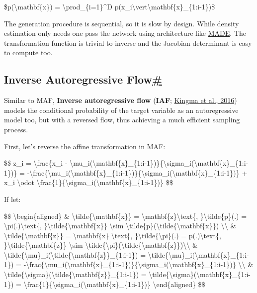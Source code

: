 \$p(\textbackslash mathbf\{x\}) = \textbackslash prod\_\{i=1\}\^{}D p(x\_i\textbackslash vert\textbackslash mathbf\{x\}\_\{1:i-1\})\$

The generation procedure is sequential, so it is slow by design. While density estimation only needs one pass the network using architecture like \hyperref[MADE]{MADE}. The transformation function is trivial to inverse and the Jacobian determinant is easy to compute too.

\subsection{\texorpdfstring{Inverse Autoregressive Flow\hyperref[inverse-autoregressive-flow]{\#}}{Inverse Autoregressive Flow\#}}\label{inverse-autoregressive-flow}

Similar to MAF, \textbf{Inverse autoregressive flow} (\textbf{IAF}; \href{https://arxiv.org/abs/1606.04934}{Kingma et al., 2016}) models the conditional probability of the target variable as an autoregressive model too, but with a reversed flow, thus achieving a much efficient sampling process.

First, let's reverse the affine transformation in MAF:

\$\$ z\_i = \textbackslash frac\{x\_i - \textbackslash mu\_i(\textbackslash mathbf\{x\}\_\{1:i-1\})\}\{\textbackslash sigma\_i(\textbackslash mathbf\{x\}\_\{1:i-1\})\} = -\textbackslash frac\{\textbackslash mu\_i(\textbackslash mathbf\{x\}\_\{1:i-1\})\}\{\textbackslash sigma\_i(\textbackslash mathbf\{x\}\_\{1:i-1\})\} + x\_i \textbackslash odot \textbackslash frac\{1\}\{\textbackslash sigma\_i(\textbackslash mathbf\{x\}\_\{1:i-1\})\} \$\$

If let:

\$\$ \textbackslash begin\{aligned\} \& \textbackslash tilde\{\textbackslash mathbf\{x\}\} = \textbackslash mathbf\{z\}\textbackslash text\{, \}\textbackslash tilde\{p\}(.) = \textbackslash pi(.)\textbackslash text\{, \}\textbackslash tilde\{\textbackslash mathbf\{x\}\} \textbackslash sim \textbackslash tilde\{p\}(\textbackslash tilde\{\textbackslash mathbf\{x\}\}) \textbackslash\textbackslash{} \& \textbackslash tilde\{\textbackslash mathbf\{z\}\} = \textbackslash mathbf\{x\} \textbackslash text\{, \}\textbackslash tilde\{\textbackslash pi\}(.) = p(.)\textbackslash text\{, \}\textbackslash tilde\{\textbackslash mathbf\{z\}\} \textbackslash sim \textbackslash tilde\{\textbackslash pi\}(\textbackslash tilde\{\textbackslash mathbf\{z\}\})\textbackslash\textbackslash{} \& \textbackslash tilde\{\textbackslash mu\}\_i(\textbackslash tilde\{\textbackslash mathbf\{z\}\}\_\{1:i-1\}) = \textbackslash tilde\{\textbackslash mu\}\_i(\textbackslash mathbf\{x\}\_\{1:i-1\}) = -\textbackslash frac\{\textbackslash mu\_i(\textbackslash mathbf\{x\}\_\{1:i-1\})\}\{\textbackslash sigma\_i(\textbackslash mathbf\{x\}\_\{1:i-1\})\} \textbackslash\textbackslash{} \& \textbackslash tilde\{\textbackslash sigma\}(\textbackslash tilde\{\textbackslash mathbf\{z\}\}\_\{1:i-1\}) = \textbackslash tilde\{\textbackslash sigma\}(\textbackslash mathbf\{x\}\_\{1:i-1\}) = \textbackslash frac\{1\}\{\textbackslash sigma\_i(\textbackslash mathbf\{x\}\_\{1:i-1\})\} \textbackslash end\{aligned\} \$\$

